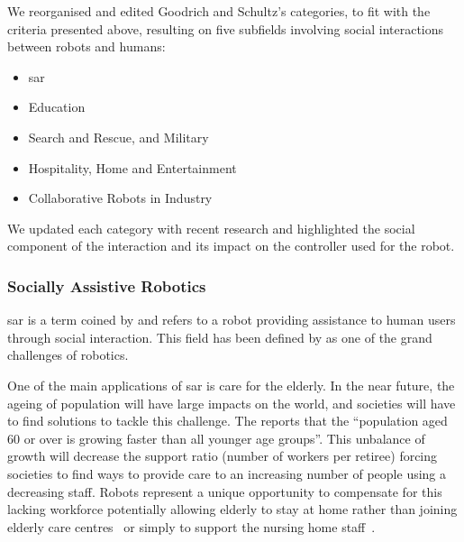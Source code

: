 We reorganised and edited Goodrich and Schultz's categories, to fit with the criteria presented above, resulting on five subfields involving social interactions between robots and humans: 
\begin{itemize}
	\item \acrfull{sar}
	\item Education
	\item Search and Rescue, and Military
	\item Hospitality, Home and Entertainment
	\item Collaborative Robots in Industry
\end{itemize}
We updated each category with recent research and highlighted the social component of the interaction and its impact on the controller used for the robot.

\subsubsection{Socially Assistive Robotics}

	\gls{sar} is a term coined by \cite{feil2005defining} and refers to a robot providing assistance to human users through social interaction. This field has been defined by \cite{tapus2007socially} as one of the grand challenges of robotics.
	
	One of the main applications of \gls{sar} is care for the elderly. In the near future, the ageing of population will have large impacts on the world, and societies will have to find solutions to tackle this challenge. The \cite{united2017world} reports that the ``population aged 60 or over is growing faster than all younger age groups''. This unbalance of growth will decrease the support ratio (number of workers per retiree) forcing societies to find ways to provide care to an increasing number of people using a decreasing staff. Robots represent a unique opportunity to compensate for this lacking workforce potentially allowing elderly to stay at home rather than joining elderly care centres~\citep{di2014web} or simply to support the nursing home staff~\citep{wada2004effects}.
	
	
